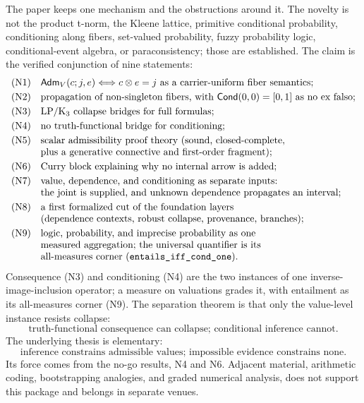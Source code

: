 \documentclass[11pt,a4paper]{article}
\newcommand{\Cond}{\mathsf{Cond}}
\newcommand{\Adm}{\mathsf{Adm}}
\newcommand{\conjc}{\otimes}
\newcommand{\Lean}[1]{\texttt{#1}}
\begin{document}
The paper keeps one mechanism and the obstructions around it.  The
novelty is not the product t-norm, the Kleene lattice, primitive
conditional probability, conditioning along fibers, set-valued
probability, fuzzy probability logic, conditional-event algebra, or
paraconsistency; those are established.  The claim is the verified
conjunction of nine statements:
\[
\begin{array}{ll}
\text{(N1)} &
\Adm_V(c;j,e)\Longleftrightarrow c\conjc e=j
\text{ as a carrier-uniform fiber semantics};\\[1mm]
\text{(N2)} &
\text{propagation of non-singleton fibers, with }
\Cond(0,0)=[0,1]\text{ as no ex falso};\\[1mm]
\text{(N3)} & \text{LP/K$_3$ collapse bridges for full formulas};\\[1mm]
\text{(N4)} & \text{no truth-functional bridge for conditioning};\\[1mm]
\text{(N5)} & \text{scalar admissibility proof theory (sound, closed-complete},\\
  & \text{plus a generative connective and first-order fragment)};\\[1mm]
\text{(N6)} & \text{Curry block explaining why no internal arrow is added};\\[1mm]
\text{(N7)} & \text{value, dependence, and conditioning as separate inputs:}\\
  & \text{the joint is supplied, and unknown dependence propagates an interval};\\[1mm]
\text{(N8)} & \text{a first formalized cut of the foundation layers}\\
  & \text{(dependence contexts, robust collapse, provenance, branches)};\\[1mm]
\text{(N9)} & \text{logic, probability, and imprecise probability as one}\\
  & \text{measured aggregation; the universal quantifier is its}\\
  & \text{all-measures corner (\Lean{entails\_iff\_cond\_one}).}
\end{array}
\]
Consequence (N3) and conditioning (N4) are the two instances of one
inverse-image-inclusion operator; a measure on valuations grades it,
with entailment as its all-measures corner (N9).  The separation theorem
is that only the value-level instance resists collapse:
\[
\boxed{\text{truth-functional consequence can collapse;
conditional inference cannot.}}
\]
The underlying thesis is elementary:
\[
\boxed{\text{inference constrains admissible values;
impossible evidence constrains none.}}
\]
Its force comes from the no-go results, N4 and N6.  Adjacent material,
arithmetic coding, bootstrapping analogies, and graded numerical
analysis, does not support this package and belongs in separate venues.
\end{document}
